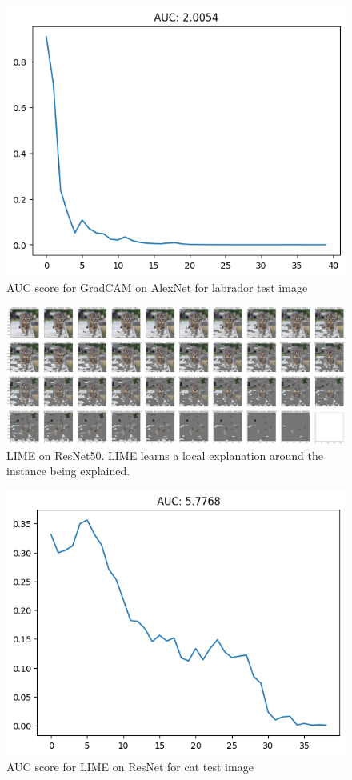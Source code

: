 \documentclass{article}
\begin{document}
\begin{figure}
    \centering
    \includegraphics[width=1\linewidth]{results/gradcam-labrador-auc.png}
    \caption{AUC score for GradCAM on AlexNet for labrador test image}
    \label{fig:gradcam-labrador-auc}
\end{figure}


\begin{figure}
    \centering
    \includegraphics[width=1\linewidth]{results/lime-tabby-feature-removal.png}
    \caption{LIME on ResNet50. LIME learns a local explanation around the instance being explained.}
    \label{fig:lime-tabby-feature-removal}
\end{figure}


\begin{figure}
    \centering
    \includegraphics[width=1\linewidth]{results/lime-tabby-auc.png}
    \caption{AUC score for LIME on ResNet for cat test image}
    \label{fig:lime-tabby-auc}
\end{figure}



\end{document}

